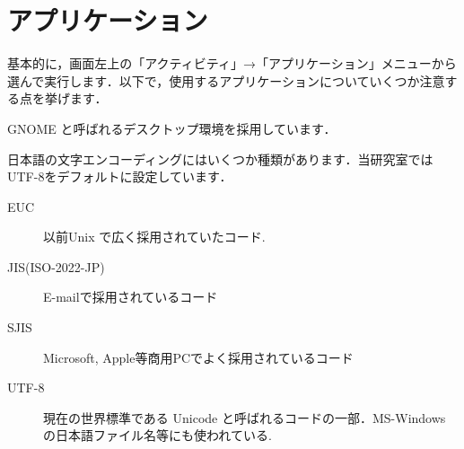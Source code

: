 \documentclass[main]{subfiles}
\begin{document}
\vspace{9pt}
\chapter{アプリケーション}
\fontsize{10}{13} \selectfont

基本的に，画面左上の「アクティビティ」→「アプリケーション」メニューから選んで実行します．以下で，使用するアプリケーションについていくつか注意する点を挙げます．\\

\begin{description}[itemsep=0.8em]
    \item[デスクトップ環境] GNOME と呼ばれるデスクトップ環境を採用しています．
    \item[日本語エンコーディング] 日本語の文字エンコーディングにはいくつか種類があります．当研究室ではUTF-8をデフォルトに設定しています．
    \begin{description}
        \item[EUC] 以前Unix で広く採用されていたコード.
        \item[JIS(ISO-2022-JP)] E-mailで採用されているコード
        \item[SJIS] Microsoft, Apple等商用PCでよく採用されているコード
        \item[UTF-8] 現在の世界標準である Unicode と呼ばれるコードの一部．MS-Windows の日本語ファイル名等にも使われている.
    \end{description}
    

\end{description}
\end{document}
